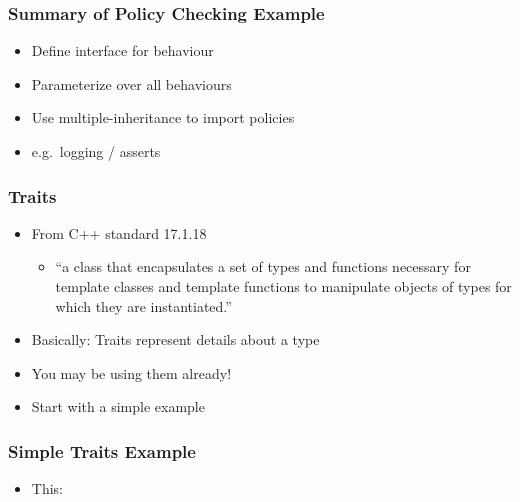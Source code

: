 \begin{verbatim}
\end{verbatim}

\subsubsection{Summary of Policy Checking
Example}\label{summary-of-policy-checking-example}

\begin{itemize}
\itemsep1pt\parskip0pt
\item
  Define interface for behaviour
\item
  Parameterize over all behaviours
\item
  Use multiple-inheritance to import policies
\item
  e.g.~logging / asserts
\end{itemize}

\subsubsection{Traits}\label{traits}

\begin{itemize}
\itemsep1pt\parskip0pt
\item
  From C++ standard 17.1.18

  \begin{itemize}
  \itemsep1pt\parskip0pt
  \item
    ``a class that encapsulates a set of types and functions necessary
    for template classes and template functions to manipulate objects of
    types for which they are instantiated.''
  \end{itemize}
\item
  Basically: Traits represent details about a type
\item
  You may be using them already!
\item
  Start with a simple example
\end{itemize}

\subsubsection{Simple Traits Example}\label{simple-traits-example}

\begin{itemize}
\itemsep1pt\parskip0pt
\item
  This:
\end{itemize}

